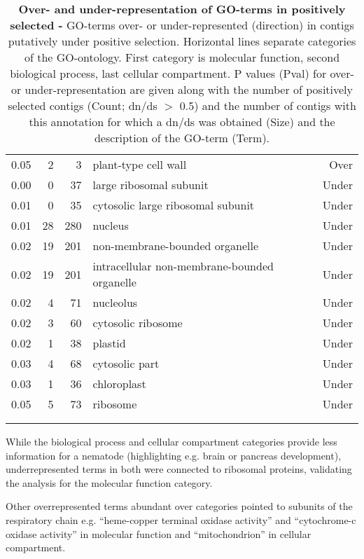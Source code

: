 \begin{longtable}{rrrp{7cm}r}
  0.05 &   2 &   3 & plant-type cell wall & Over \\ 
  0.00 &   0 &  37 & large ribosomal subunit & Under \\ 
  0.01 &   0 &  35 & cytosolic large ribosomal subunit & Under \\ 
  0.01 &  28 & 280 & nucleus & Under \\ 
  0.02 &  19 & 201 & non-membrane-bounded organelle & Under \\ 
  0.02 &  19 & 201 & intracellular non-membrane-bounded organelle & Under \\ 
  0.02 &   4 &  71 & nucleolus & Under \\ 
  0.02 &   3 &  60 & cytosolic ribosome & Under \\ 
  0.02 &   1 &  38 & plastid & Under \\ 
  0.03 &   4 &  68 & cytosolic part & Under \\ 
  0.03 &   1 &  36 & chloroplast & Under \\ 
  0.05 &   5 &  73 & ribosome & Under \\ 
  \hline\\
\caption[Over- and under-representation of GO-terms in positively
selected]{\textbf{Over- and under-representation of GO-terms in
    positively selected -} GO-terms over- or under-represented
  (direction) in contigs putatively under positive
  selection. Horizontal lines separate categories of the
  GO-ontology. First category is molecular function, second biological
  process, last cellular compartment. P values (Pval) for over- or
  under-representation are given along with the number of positively
  selected contigs (Count; dn/ds $>$ 0.5) and the number of contigs
  with this annotation for which a dn/ds was obtained (Size) and the
  description of the GO-term (Term).} \label{go-pos}\\
\end{longtable}


While the biological process and cellular compartment categories
provide less information for a nematode (highlighting e.g. brain or
pancreas development), underrepresented terms in both were connected
to ribosomal proteins, validating the analysis for the molecular
function category.

Other overrepresented terms abundant over categories pointed to
subunits of the respiratory chain e.g. ``heme-copper terminal oxidase
activity'' and ``cytochrome-c oxidase activity'' in molecular function
and ``mitochondrion'' in cellular compartment.

